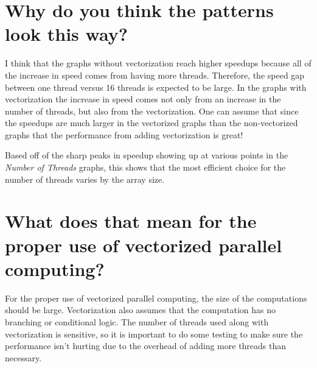 \documentclass[onecolumn,draftclsnofoot, 10pt, compsoc]{IEEEtran}
\begin{document}
	
	
	
	\section{Why do you think the patterns look this way?}
		I think that the graphs without vectorization reach higher speedups because all of the increase in speed comes from having more threads. Therefore, the speed gap between one thread versus 16 threads is expected to be large. In the graphs with vectorization the increase in speed comes not only from an increase in the number of threads, but also from the vectorization. One can assume that since the speedups are much larger in the vectorized graphs than the non-vectorized graphs that the performance from adding vectorization is great!
		
		Based off of the sharp peaks in speedup showing up at various points in the \textit{Number of Threads} graphs, this shows that the most efficient choice for the number of threads varies by the array size.
	
	
	
	\section{What does that mean for the proper use of vectorized parallel computing?}
		For the proper use of vectorized parallel computing, the size of the computations should be large. 
		Vectorization also assumes that the computation has no branching or conditional logic.
		The number of threads used along with vectorization is sensitive, so it is important to do some testing to make sure the performance isn't hurting due to the overhead of adding more threads than necessary.
\end{document}
